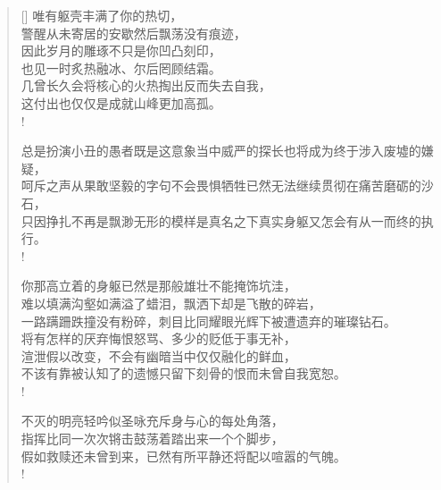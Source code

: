 \documentclass[UTF8, 12pt, a4paper]{ctexrep} %
\begin{document}
\begin{verse}[\versewidth]
唯有躯壳丰满了你的热切，\\
警醒从未寄居的安歇然后飘荡没有痕迹，\\
因此岁月的雕琢不只是你凹凸刻印，\\
也见一时炙热融冰、尔后罔顾结霜。\\
几曾长久会将核心的火热掏出反而失去自我，\\
这付出也仅仅是成就山峰更加高孤。\\!

总是扮演小丑的愚者既是这意象当中威严的探长也将成为终于涉入废墟的嫌疑，\\
呵斥之声从果敢坚毅的字句不会畏惧牺牲已然无法继续贯彻在痛苦磨砺的沙石，\\
只因挣扎不再是飘渺无形的模样是真名之下真实身躯又怎会有从一而终的执行。\\!

你那高立着的身躯已然是那般雄壮不能掩饰坑洼，\\
难以填满沟壑如满溢了蜡泪，飘洒下却是飞散的碎岩，\\
一路蹒跚跌撞没有粉碎，刺目比同耀眼光辉下被遭遗弃的璀璨钻石。\\
将有怎样的厌弃悔恨怒骂、多少的贬低于事无补，\\
渲泄假以改变，不会有幽暗当中仅仅融化的鲜血，\\
不该有靠被认知了的遗憾只留下刻骨的恨而未曾自我宽恕。\\!

不灭的明亮轻吟似圣咏充斥身与心的每处角落，\\
指挥比同一次次锵击鼓荡着踏出来一个个脚步，\\
假如救赎还未曾到来，已然有所平静还将配以喧嚣的气魄。\\!

\end{verse}
\end{document}
